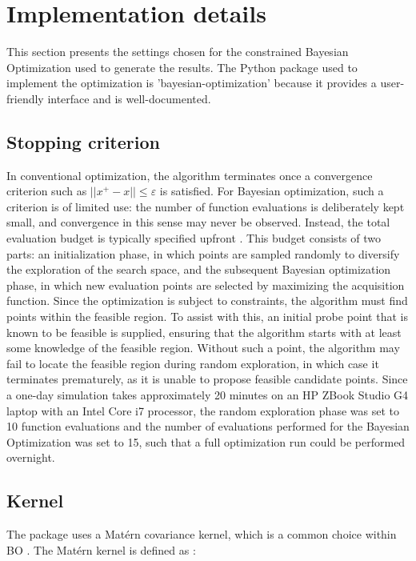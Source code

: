 \section{Implementation details} \label{sec::BOimplementation}
This section presents the settings chosen for the constrained Bayesian Optimization used to generate the results. The Python package used to implement the optimization is 'bayesian-optimization' because it provides a user-friendly interface and is well-documented. 

\subsection{Stopping criterion}
In conventional optimization, the algorithm terminates once a convergence criterion such as $||x^{+} -x|| \leq \varepsilon$ is satisfied. For Bayesian optimization, such a criterion is of limited use: the number of function evaluations is deliberately kept small, and convergence in this sense may never be observed. Instead, the total evaluation budget is typically specified upfront \cite{bo_tutorial}. This budget consists of two parts: an initialization phase, in which points are sampled randomly to diversify the exploration of the search space, and the subsequent Bayesian optimization phase, in which new evaluation points are selected by maximizing the acquisition function. Since the optimization is subject to constraints, the algorithm must find points within the feasible region. To assist with this, an initial probe point that is known to be feasible is supplied, ensuring that the algorithm starts with at least some knowledge of the feasible region. Without such a point, the algorithm may fail to locate the feasible region during random exploration, in which case it terminates prematurely, as it is unable to propose feasible candidate points. Since a one-day simulation takes approximately 20 minutes on an HP ZBook Studio G4 laptop with an Intel Core i7 processor, the random exploration phase was set to 10 function evaluations and the number of evaluations performed for the Bayesian Optimization was set to 15, such that a full optimization run could be performed overnight. 

\subsection{Kernel}
The package uses a Mat\'ern  covariance kernel, which is a common choice within BO \cite{bo_tutorial}. The Mat\'ern kernel is defined as \cite{rasmussen2006gaussian}:

